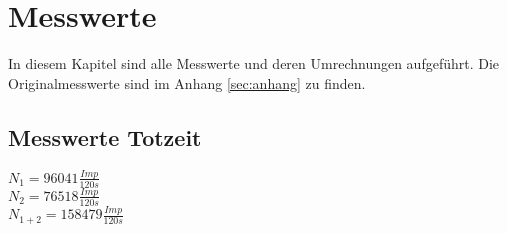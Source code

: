 \section{Messwerte}
\label{sec:messwerte}
In diesem Kapitel sind alle Messwerte und deren Umrechnungen aufgeführt. Die Originalmesswerte 
sind im Anhang \autoref{sec:anhang} zu finden.
\subsection{Messwerte Totzeit}
\label{sec:werteTotzeit}
\begin{center}
    $N_1=96041 \frac{Imp}{120 s}$\\
    $N_2=76518 \frac{Imp}{120 s}$\\
    $N_{1+2}=158479 \frac{Imp}{120 s}$
\end{center}

